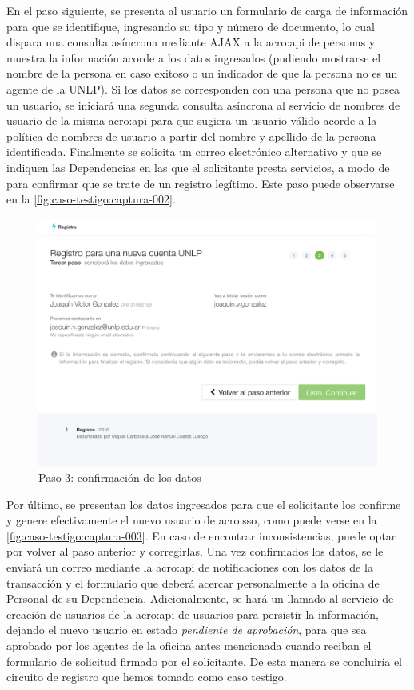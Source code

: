 En el paso siguiente, se presenta al usuario un formulario de carga de información para que se identifique, ingresando su tipo y número de documento, lo cual dispara una consulta asíncrona mediante AJAX a la \gls{acro:api} de personas y muestra la información acorde a los datos ingresados (pudiendo mostrarse el nombre de la persona en caso exitoso o un indicador de que la persona no es un agente de la UNLP). Si los datos se corresponden con una persona que no posea un usuario, se iniciará una segunda consulta asíncrona al servicio de nombres de usuario de la misma \gls{acro:api} para que sugiera un usuario válido acorde a la política de nombres de usuario a partir del nombre y apellido de la persona identificada. Finalmente se solicita un correo electrónico alternativo y que se indiquen las Dependencias en las que el solicitante presta servicios, a modo de  para confirmar que se trate de un registro legítimo. Este paso puede observarse en la \autoref{fig:caso-testigo:captura-002}.

\begin{figure}
  \centering
  \includegraphics[width=\textwidth,keepaspectratio]{src/images/05-capitulo-5/capturas/page_003.png}
  \caption{Paso 3: confirmación de los datos}
  \label{fig:caso-testigo:captura-003}
\end{figure}

Por último, se presentan los datos ingresados para que el solicitante los confirme y genere efectivamente el nuevo usuario de \gls{acro:sso}, como puede verse en la \autoref{fig:caso-testigo:captura-003}. En caso de encontrar inconsistencias, puede optar por volver al paso anterior y corregirlas. Una vez confirmados los datos, se le enviará un correo mediante la \gls{acro:api} de notificaciones con los datos de la transacción y el formulario que deberá acercar personalmente a la oficina de Personal de su Dependencia. Adicionalmente, se hará un llamado al servicio de creación de usuarios de la \gls{acro:api} de usuarios para persistir la información, dejando el nuevo usuario en estado \textit{pendiente de aprobación}, para que sea aprobado por los agentes de la oficina antes mencionada cuando reciban el formulario de solicitud firmado por el solicitante. De esta manera se concluiría el circuito de registro que hemos tomado como caso testigo.

